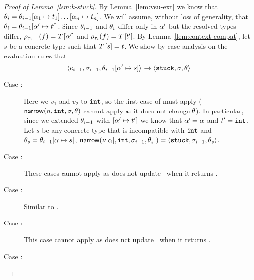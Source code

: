 \begin{proof}[Proof of Lemma~\ref{lem:k-stuck}]
  By Lemma~\ref{lem:vsu-ext} we know that
  $\theta_{i} = \theta_{i-1}[\alpha_1 \mapsto t_1] \ldots [\alpha_n \mapsto t_n]$.
  We will assume, without loss of generality, that
  $\theta_{i} = \theta_{i-1}[\alpha' \mapsto t']$.
  Since $\theta_{i-1}$ and $\theta_{i}$ differ only in $\alpha'$ but the resolved
  types differ,
  $\rho_{\tau_{i-1}}(f) = T\left[\alpha'\right]$
  and
  $\rho_{\tau_i}(f) = T\left[t'\right]$.
  By Lemma~\ref{lem:context-compat},
  let $s$ be a concrete type such that $T\left[s\right] = t$.
  We show by case analysis on the evaluation rules that
  $$\langle e_{i-1}, \sigma_{i-1}, \theta_{i-1}[\alpha' \mapsto s] \rangle \hookrightarrow \langle \mathtt{stuck}, \sigma, \theta \rangle$$
    \begin{description}
    \item[Case \replusgood:]
      Here we \forcesym $v_1$ and $v_2$ to $\mathtt{int}$, so the first case of
      \forcesym must apply ($\mathsf{narrow}(n, \mathtt{int}, \sigma, \theta)$ cannot apply
      as it does not change $\theta$).
      In particular, since we extended $\theta_{i-1}$ with
      $[\alpha' \mapsto t']$ we know that $\alpha' = \alpha$ and
      $t' = \mathtt{int}$.
      Let $s$ be any concrete type that is incompatible with $\mathtt{int}$
      and $\theta_s = \theta_{i-1}[\alpha \mapsto s]$,
      $\mathsf{narrow}(\nu[\alpha], \mathtt{int}, \sigma_{i-1}, \theta_s]) = \langle \mathtt{stuck}, \sigma_{i-1}, \theta_s \rangle$.
    \item[Case :]
      These cases cannot apply as \forcesym does not update \tsu\ when
      it returns \stuck.
    \item[Case :]
      Similar to \replusgood.
    \item[Case \reifbad:]
      This case cannot apply as \forcesym does not update \tsu\ when
      it returns \stuck.
    \item[Case \reappgood:]

\end{description}
\end{proof}
